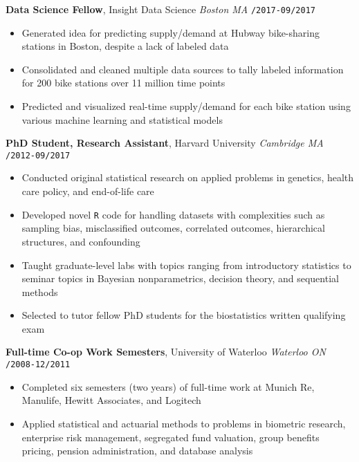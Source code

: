 \documentclass[10pt,english]{report}
\begin{document}
\vspace{1mm}

\textbf{Data Science Fellow}, Insight Data Science \hfill \textit{Boston MA} \texttt{/2017-09/2017}
\begin{itemize}
\item Generated idea for predicting supply/demand at Hubway bike-sharing stations in Boston, despite a lack of labeled data
\item Consolidated and cleaned multiple data sources to tally labeled information for 200 bike stations over 11 million time points
\item Predicted and visualized real-time supply/demand for each bike station using various machine learning and statistical models
\end{itemize}

\vspace{1mm}

\textbf{PhD Student, Research Assistant}, Harvard University \hfill \textit{Cambridge MA} \texttt{/2012-09/2017}
\begin{itemize}
\item Conducted original statistical research on applied problems in genetics, health care policy, and end-of-life care
\item Developed novel \texttt{R} code for handling datasets with complexities such as sampling bias, misclassified outcomes, correlated outcomes, hierarchical structures, and confounding
\item Taught graduate-level labs with topics ranging from introductory statistics to seminar topics in Bayesian nonparametrics, decision theory, and sequential methods
\item Selected to tutor fellow PhD students for the biostatistics written qualifying exam
\end{itemize}

\vspace{1mm}

\textbf{Full-time Co-op Work Semesters}, University of Waterloo \hfill \textit{Waterloo ON} \texttt{/2008-12/2011}
\begin{itemize}
\item Completed six semesters (two years) of full-time work at Munich Re, Manulife, Hewitt Associates, and Logitech
\item Applied statistical and actuarial methods to problems in biometric research, enterprise risk management, segregated fund valuation, group benefits pricing, pension administration, and database analysis
\end{itemize}
\end{document}
